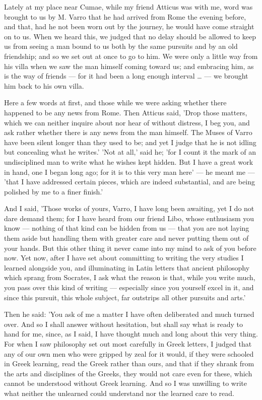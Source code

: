 
 Lately at my place near Cumae, while my friend Atticus was with me, word was brought to us by M. Varro that he had arrived from Rome the evening before, and that, had he not been worn out by the journey, he would have come straight on to us. When we heard this, we judged that no delay should be allowed to keep us from seeing a man bound to us both by the same pursuits and by an old friendship; and so we set out at once to go to him. We were only a little way from his villa when we saw the man himself coming toward us; and embracing him, as is the way of friends — for it had been a long enough interval … — we brought him back to his own villa.

 Here a few words at first, and those while we were asking whether there happened to be any news from Rome. Then Atticus said, 'Drop those matters, which we can neither inquire about nor hear of without distress, I beg you, and ask rather whether there is any news from the man himself. The Muses of Varro have been silent longer than they used to be; and yet I judge that he is not idling but concealing what he writes.' 'Not at all,' said he; 'for I count it the mark of an undisciplined man to write what he wishes kept hidden. But I have a great work in hand, one I began long ago; for it is to this very man here' — he meant me — 'that I have addressed certain pieces, which are indeed substantial, and are being polished by me to a finer finish.'

 And I said, 'Those works of yours, Varro, I have long been awaiting, yet I do not dare demand them; for I have heard from our friend Libo, whose enthusiasm you know — nothing of that kind can be hidden from us — that you are not laying them aside but handling them with greater care and never putting them out of your hands. But this other thing it never came into my mind to ask of you before now. Yet now, after I have set about committing to writing the very studies I learned alongside you, and illuminating in Latin letters that ancient philosophy which sprang from Socrates, I ask what the reason is that, while you write much, you pass over this kind of writing — especially since you yourself excel in it, and since this pursuit, this whole subject, far outstrips all other pursuits and arts.'

 Then he said: 'You ask of me a matter I have often deliberated and much turned over. And so I shall answer without hesitation, but shall say what is ready to hand for me, since, as I said, I have thought much and long about this very thing. For when I saw philosophy set out most carefully in Greek letters, I judged that any of our own men who were gripped by zeal for it would, if they were schooled in Greek learning, read the Greek rather than ours, and that if they shrank from the arts and disciplines of the Greeks, they would not care even for these, which cannot be understood without Greek learning. And so I was unwilling to write what neither the unlearned could understand nor the learned care to read.

